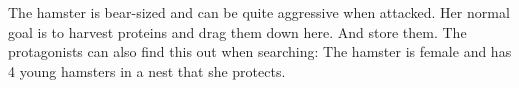 \begin{npcBox}[title=Monkey]
    \begin{consequences}
    \item {}
    \item {}
    \item {}
    \end{consequences}

    \begin{npcDescription}
    The hamster is bear-sized and can be quite aggressive when attacked. Her normal goal is to harvest proteins and drag them down here. And store them. The protagonists can also find this out when searching: The hamster is female and has 4 young hamsters in a nest that she protects.
    \end{npcDescription}

\end{npcBox}